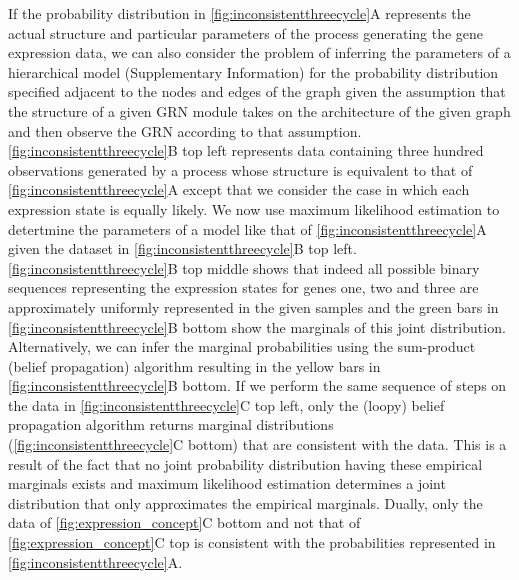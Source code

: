 If the probability distribution in \ref{fig:inconsistentthreecycle}A represents the actual structure and particular parameters of the process generating the gene expression data, we can also consider the problem of inferring the parameters of a hierarchical model (Supplementary Information) for the probability distribution specified adjacent to the nodes and edges of the graph given the assumption that the structure of a given GRN module takes on the architecture of the given graph and then observe the GRN according to that assumption. \ref{fig:inconsistentthreecycle}B top left represents data containing three hundred observations generated by a process whose structure is equivalent to that of \ref{fig:inconsistentthreecycle}A except that we consider the case in which each expression state is equally likely. We now use maximum likelihood estimation \cite{Barber2012} to detertmine the parameters of a model like that of \ref{fig:inconsistentthreecycle}A given the dataset in \ref{fig:inconsistentthreecycle}B top left. \ref{fig:inconsistentthreecycle}B top middle shows that indeed all possible binary sequences representing the expression states for genes one, two and three are approximately uniformly represented in the given samples and the green bars in \ref{fig:inconsistentthreecycle}B bottom show the marginals of this joint distribution. Alternatively, we can infer the marginal probabilities using the sum-product (belief propagation) algorithm \cite{Barber2012} resulting in the yellow bars in \ref{fig:inconsistentthreecycle}B bottom. If we perform the same sequence of steps on the data in \ref{fig:inconsistentthreecycle}C top left, only the (loopy) belief propagation algorithm returns marginal distributions (\ref{fig:inconsistentthreecycle}C bottom) that are consistent with the data. This is a result of the fact that no joint probability distribution having these empirical marginals exists and maximum likelihood estimation determines a joint distribution that only approximates the empirical marginals. Dually, only the data of \ref{fig:expression_concept}C bottom and not that of \ref{fig:expression_concept}C top is consistent with the probabilities represented in \ref{fig:inconsistentthreecycle}A.


